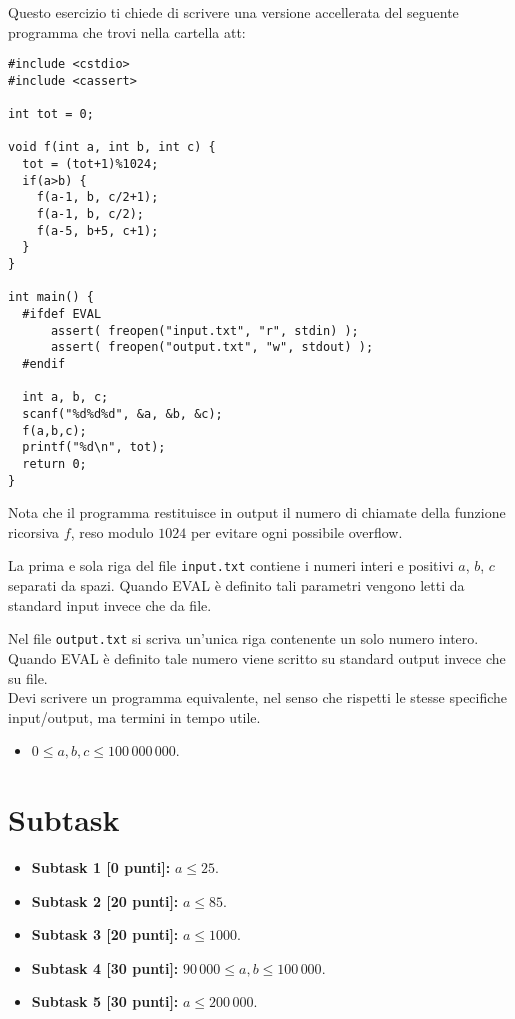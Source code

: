\renewcommand{\nomebreve}{calls}
\renewcommand{\titolo}{Conta le chiamate}

\introduzione{}

Questo esercizio ti chiede di scrivere una versione accellerata
del seguente programma che trovi nella cartella att:
\begin{verbatim}
#include <cstdio>
#include <cassert>

int tot = 0;

void f(int a, int b, int c) {
  tot = (tot+1)%1024;
  if(a>b) {
    f(a-1, b, c/2+1);
    f(a-1, b, c/2);
    f(a-5, b+5, c+1);
  }
}

int main() {
  #ifdef EVAL
      assert( freopen("input.txt", "r", stdin) );
      assert( freopen("output.txt", "w", stdout) );
  #endif

  int a, b, c;
  scanf("%d%d%d", &a, &b, &c);
  f(a,b,c);
  printf("%d\n", tot);
  return 0;
}
\end{verbatim}

Nota che il programma restituisce in output il numero di chiamate della funzione ricorsiva $f$, reso modulo $1024$ per evitare ogni possibile overflow.

La prima e sola riga del file \verb'input.txt' contiene i numeri interi e positivi $a$, $b$, $c$ separati da spazi.
Quando EVAL \`e definito tali parametri vengono letti da standard input invece che da file.

Nel file \verb'output.txt' si scriva un'unica riga contenente un solo numero intero.
Quando EVAL \`e definito tale numero viene scritto su standard output invece che su file.\\


Devi scrivere un programma equivalente, nel senso che rispetti le stesse specifiche input/output,
ma termini in tempo utile.\\

\begin{itemize}[nolistsep, noitemsep]
\item $0 \leq a,b,c \leq 100\,000\,000$.
\end{itemize}
  
  \section*{Subtask}
  \begin{itemize}
    \item \textbf{Subtask 1 [0 punti]:} $a \leq 25$.
    \item \textbf{Subtask 2 [20 punti]:} $a \leq 85$.
    \item \textbf{Subtask 3 [20 punti]:} $a \leq 1000$.
    \item \textbf{Subtask 4 [30 punti]:} $90\,000 \leq a,b \leq 100\,000$.
    \item \textbf{Subtask 5 [30 punti]:} $a \leq 200\,000$.
  \end{itemize}
  
